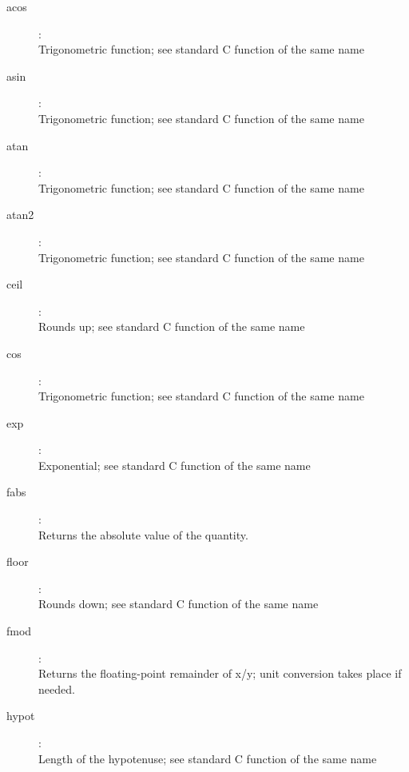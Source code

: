 \begin{description}
\item[acos]:  \\
    Trigonometric function; see standard C function of the same name

\item[asin]:  \\
    Trigonometric function; see standard C function of the same name

\item[atan]:  \\
    Trigonometric function; see standard C function of the same name

\item[atan2]:  \\
    Trigonometric function; see standard C function of the same name

\item[ceil]:  \\
    Rounds up; see standard C function of the same name

\item[cos]:  \\
    Trigonometric function; see standard C function of the same name

\item[exp]:  \\
    Exponential; see standard C function of the same name

\item[fabs]:  \\
    Returns the absolute value of the quantity.

\item[floor]:  \\
    Rounds down; see standard C function of the same name

\item[fmod]:  \\
    Returns the floating-point remainder of x/y; unit conversion takes place if
    needed.

\item[hypot]:  \\
    Length of the hypotenuse; see standard C function of the same name


\end{description}
